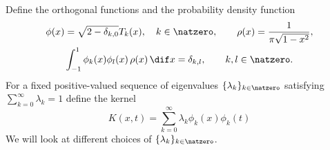 \documentclass[]{elsarticle}
\theoremstyle{definition}
\begin{document}
Define the orthogonal functions and the probability density function
\begin{gather}
\phi(x) = \sqrt{2-\delta_{k,0}} T_k(x) , \quad k \in \natzero, \qquad \rho(x) = \frac{1}{\pi\sqrt{1-x^2}}, \\
\int_{-1}^{1} \phi_k(x)\phi_{l}(x) \, \rho(x) \, \dif x = \delta_{k,l}, \qquad k,l \in \natzero.
\end{gather}
For a fixed positive-valued sequence of eigenvalues $\{\lambda_k\}_{k\in \natzero}$ satisfying $\sum_{k=0}^{\infty} \lambda_k =1$ define the kernel
\begin{equation} \label{kerneldef}
K(x,t) = \sum_{k=0}^{\infty} \lambda_k \phi_k(x)\phi_k(t)
\end{equation}
We will look at different choices of $\{\lambda_k\}_{k\in \natzero}$.
\end{document}

